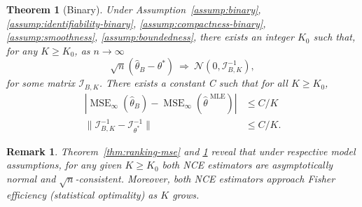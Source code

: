 \documentclass[11pt,a4paper]{article}
\newcommand{\mse}{\operatorname{MSE}}
\newcommand{\wh}[1]{\widehat{#1}}
\newcommand{\mle}{\wh{\theta}^{\text{~MLE}}}
\newcommand{\fisher}{\mathcal{I}_{\theta^*}}
\newtheorem{theorem}{Theorem}[section]
\newtheorem{remark}{Remark}[section]
\begin{document}
\begin{theorem}[Binary]
Under Assumption~\ref{assump:binary}, \ref{assump:identifiability-binary}, \ref{assump:compactness-binary}, \ref{assump:smoothness}, \ref{assump:boundedness}, there exists an integer $K_0$ such that, for any $K\geq K_0$, as $n \rightarrow\infty$
  \begin{equation}
    \sqrt{n}\left(\wh{\theta}_B -\theta^* \right) ~\Rightarrow~\mathcal{N}(0, \mathcal{I}_{B, K}^{-1}), 
  \end{equation}
for some matrix $\mathcal{I}_{B, K}$. There exists a constant C such that for all $K\geq K_0$, 
\begin{equation*}
\begin{aligned}
|\mse_{\infty} (\wh{\theta}_B) -  \mse_{\infty} (\mle)| &\leq C /  K \\
\|\mathcal{I}_{B, K}^{-1} -  \fisher^{-1}\| &\leq C/K.  
\end{aligned}
\end{equation*}
  \label{thm:binary-mse}
  \vspace{-0.4cm}
\end{theorem}

\begin{remark}
  Theorem~\ref{thm:ranking-mse} and \ref{thm:binary-mse} reveal that under respective model assumptions, for any given $K\geq K_0$ both NCE estimators are asymptotically normal and $\sqrt{n}$-consistent. Moreover, both NCE estimators approach Fisher efficiency (statistical optimality) as $K$ grows. 
\end{remark}
\end{document}
